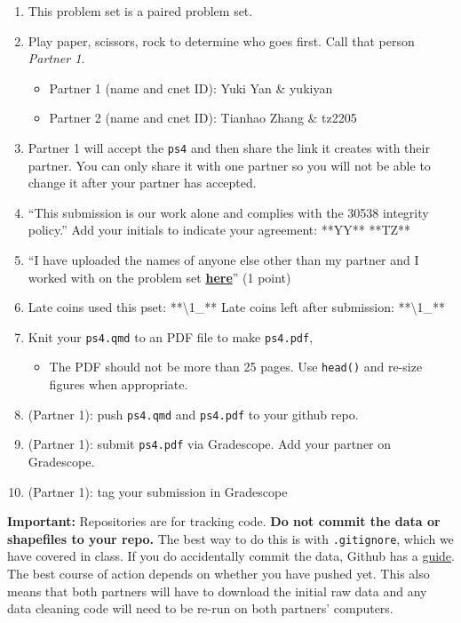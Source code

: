 \documentclass[
  letterpaper,
  DIV=11,
  numbers=noendperiod]{scrartcl}
\providecommand{\tightlist}{%
  \setlength{\itemsep}{0pt}\setlength{\parskip}{0pt}}\usepackage{longtable,booktabs,array}
\begin{document}
\begin{enumerate}
\def\labelenumi{\arabic{enumi}.}
\tightlist
\item
  This problem set is a paired problem set.
\item
  Play paper, scissors, rock to determine who goes first. Call that
  person \emph{Partner 1}.

  \begin{itemize}
  \tightlist
  \item
    Partner 1 (name and cnet ID): Yuki Yan \& yukiyan
  \item
    Partner 2 (name and cnet ID): Tianhao Zhang \& tz2205
  \end{itemize}
\item
  Partner 1 will accept the \texttt{ps4} and then share the link it
  creates with their partner. You can only share it with one partner so
  you will not be able to change it after your partner has accepted.
\item
  ``This submission is our work alone and complies with the 30538
  integrity policy.'' Add your initials to indicate your agreement:
  **YY** **TZ**
\item
  ``I have uploaded the names of anyone else other than my partner and I
  worked with on the problem set
  \textbf{\href{https://docs.google.com/forms/d/185usrCREQaUbvAXpWhChkjghdGgmAZXA3lPWpXLLsts/edit}{here}}''
  (1 point)
\item
  Late coins used this pset: **\textbackslash1\_** Late coins left after
  submission: **\textbackslash1\_**
\item
  Knit your \texttt{ps4.qmd} to an PDF file to make \texttt{ps4.pdf},

  \begin{itemize}
  \tightlist
  \item
    The PDF should not be more than 25 pages. Use \texttt{head()} and
    re-size figures when appropriate.
  \end{itemize}
\item
  (Partner 1): push \texttt{ps4.qmd} and \texttt{ps4.pdf} to your github
  repo.
\item
  (Partner 1): submit \texttt{ps4.pdf} via Gradescope. Add your partner
  on Gradescope.
\item
  (Partner 1): tag your submission in Gradescope
\end{enumerate}

\textbf{Important:} Repositories are for tracking code. \textbf{Do not
commit the data or shapefiles to your repo.} The best way to do this is
with \texttt{.gitignore}, which we have covered in class. If you do
accidentally commit the data, Github has a
\href{https://docs.github.com/en/repositories/working-with-files/managing-large-files/about-large-files-on-github\#removing-files-from-a-repositorys-history}{guide}.
The best course of action depends on whether you have pushed yet. This
also means that both partners will have to download the initial raw data
and any data cleaning code will need to be re-run on both partners'
computers.
\end{document}
